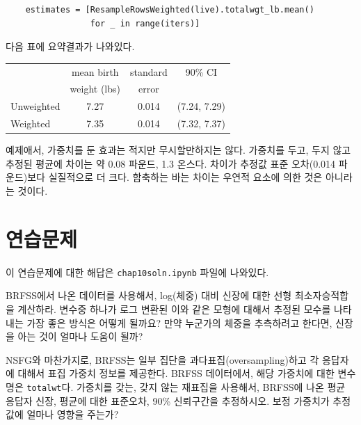 \begin{verbatim}
    estimates = [ResampleRowsWeighted(live).totalwgt_lb.mean()
                 for _ in range(iters)]
\end{verbatim}

다음 표에 요약결과가 나와있다.

\begin{center}
\begin{tabular}{|l|c|c|c|}
\hline
                    &  mean birth   & standard  &  90\% CI  \\ 
                    &  weight (lbs) & error     &           \\ 
\hline
Unweighted          &  7.27  &  0.014  &  (7.24, 7.29)  \\ 
Weighted            &  7.35  &  0.014  &  (7.32, 7.37)  \\ 
\hline
\end{tabular}
\end{center}


예제애서, 가중치를 둔 효과는 적지만 무시할만하지는 않다.
가중치를 두고, 두지 않고 추정된 평균에 차이는 약 0.08 파운드, 1.3 온스다.
차이가 추정값 표준 오차(0.014 파운드)보다 실질적으로 더 크다. 함축하는 바는 차이는 우연적 요소에 의한 것은 아니라는 것이다.


\section{연습문제}

이 연습문제에 대한 해답은 \verb"chap10soln.ipynb" 파일에 나와있다.

\begin{exercise}

BRFSS에서 나온 데이터를 사용해서, log(체중) 대비 신장에 대한 선형 최소자승적합을 계산하라.
변수중 하나가 로그 변환된 이와 같은 모형에 대해서 
추정된 모수를 나타내는 가장 좋은 방식은 어떻게 될까요?
만약 누군가의 체중을 추측하려고 한다면, 신장을 아는 것이 얼마나 도움이 될까?


NSFG와 마찬가지로, BRFSS는 일부 집단을 과다표집(oversampling)하고 각 응답자에 대해서 표집 가중치 정보를 제공한다. BRFSS 데이터에서, 해당 가중치에 대한 변수명은 {\tt totalwt}다.
가중치를 갖는, 갖지 않는 재표집을 사용해서, BRFSS에 나온 평균 응답자 신장, 평균에 대한 표준오차, 90\% 신뢰구간을 추정하시오. 보정 가중치가 추정값에 얼마나 영향을 주는가?
\end{exercise}


